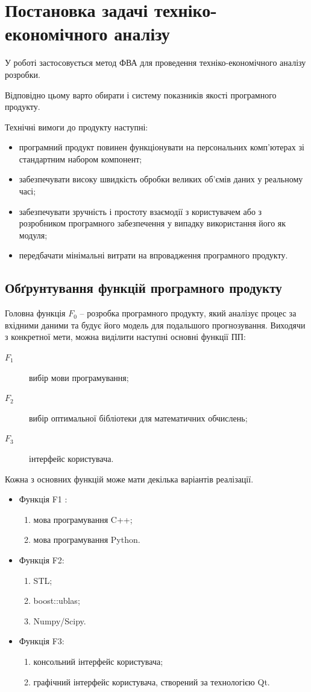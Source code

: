 \section{Постановка задачі техніко-економічного аналізу}
У роботі застосовується метод ФВА для проведення техніко-економічного аналізу розробки.

Відповідно цьому варто обирати і систему показників якості програмного продукту. 

Технічні вимоги до продукту наступні:
\begin{itemize}
	\item програмний продукт повинен функціонувати на персональних комп'ю\-терах зі стандартним набором компонент;
	\item забезпечувати високу швидкість обробки великих об'ємів даних у реальному часі;
	\item забезпечувати зручність і простоту взаємодії з користувачем або з розробником програмного забезпечення у випадку використання його як модуля;
	\item передбачати мінімальні витрати на впровадження програмного продукту.
\end{itemize}

\subsection{Обґрунтування функцій програмного продукту}
Головна функція $F_0$ – розробка програмного продукту, який аналізує процес за вхідними даними та будує його модель для подальшого прогнозування. Виходячи з конкретної мети, можна виділити наступні основні функції ПП:
\begin{description}
	\item[$F_1$] вибір мови програмування;
	\item[$F_2$] вибір оптимальної бібліотеки для математичних обчислень;
	\item[$F_3$] інтерфейс користувача.
\end{description}


Кожна з основних функцій може мати декілька варіантів реалізації.
\begin{itemize}
\item Функція F1 :
	\begin{enumerate}
		\item мова програмування C++;
		\item  мова програмування Python.
	\end{enumerate}
\item Функція F2:
	\begin{enumerate}
		\item STL;
		\item boost::ublas;
		\item Numpy/Scipy.
	\end{enumerate}
\item Функція F3:
	\begin{enumerate}
		\item консольний інтерфейс користувача;
		\item графічний інтерфейс користувача, створений за технологією Qt.
	\end{enumerate}
\end{itemize}

